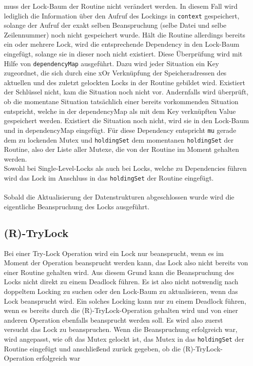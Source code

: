 muss der Lock-Baum der Routine nicht verändert werden. In diesem Fall wird 
lediglich die Information über den Aufruf des Lockings in \texttt{context} gespeichert,
solange der Aufruf der exakt selben Beanspruchung (selbe Datei und selbe Zeilennummer)
noch nicht gespeichert wurde. Hält die Routine allerdings bereits ein oder 
mehrere Lock, wird die entsprechende Dependency in den Lock-Baum eingefügt,
solange sie in dieser noch nicht existiert. Diese Überprüfung wird mit Hilfe 
von \texttt{dependencyMap} ausgeführt. Dazu wird jeder Situation ein 
Key zugeordnet, die sich durch eine xOr Verknüpfung der Speicheradressen
des aktuellen und des zuletzt gelockten Locks in der Routine gebildet wird.
Existiert der Schlüssel nicht, kam die Situation noch nicht vor. Andernfalls 
wird überprüft, ob die momentane Situation tatsächlich einer bereits vorkommenden 
Situation entspricht, welche in der dependencyMap als mit dem Key verknüpften Value 
gespeichert werden.
Existiert die Situation noch nicht, wird sie in den 
Lock-Baum und in dependencyMap eingefügt. Für diese Dependency entspricht \texttt{mu}
gerade dem zu lockenden Mutex und \texttt{holdingSet} dem momentanen \texttt{holdingSet} 
der Routine, also der Liste aller Mutexe, die von der Routine im Moment gehalten 
werden.\\
Sowohl bei Single-Level-Locks als auch bei Locks, welche zu Dependencies führen
wird das Lock im Anschluss in das \texttt{holdingSet} der Routine eingefügt.\\\\
Sobald die Aktualisierung der Datenstrukturen abgeschlossen wurde wird die 
eigentliche Beanspruchung des Locks ausgeführt.

\subsection{(R)-TryLock}
Bei einer Try-Lock Operation wird ein Lock nur beansprucht, wenn es im Moment 
der Operation beansprucht werden kann, das Lock also nicht bereits von einer Routine 
gehalten wird. Aus diesem Grund kann die Beanspruchung des Locks nicht direkt 
zu einem Deadlock führen. Es ist also nicht notwendig nach doppeltem Locking 
zu suchen oder den Lock-Baum zu aktualisieren, wenn das Lock beansprucht wird.
Ein solches Locking kann nur zu einem Deadlock führen, wenn es bereits durch 
die (R)-TryLock-Operation gehalten wird und von einer anderen Operation ebenfalls 
beansprucht werden soll. Es wird also zuerst versucht das Lock zu beanspruchen.
Wenn die Beanspruchung erfolgreich war, wird angepasst, wie oft das Mutex gelockt ist,
das Mutex in das \texttt{holdingSet} der Routine eingefügt und anschließend zurück gegeben, ob die (R)-TryLock-Operation erfolgreich war

